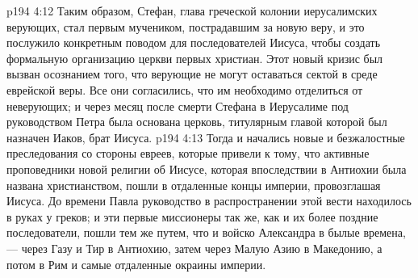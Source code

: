 \vs p194 4:12 Таким образом, Стефан, глава греческой колонии иерусалимских верующих, стал первым мучеником, пострадавшим за новую веру, и это послужило конкретным поводом для последователей Иисуса, чтобы создать формальную организацию церкви первых христиан. Этот новый кризис был вызван осознанием того, что верующие не могут оставаться сектой в среде еврейской веры. Все они согласились, что им необходимо отделиться от неверующих; и через месяц после смерти Стефана в Иерусалиме под руководством Петра была основана церковь, титулярным главой которой был назначен Иаков, брат Иисуса.
\vs p194 4:13 Тогда и начались новые и безжалостные преследования со стороны евреев, которые привели к тому, что активные проповедники новой религии об Иисусе, которая впоследствии в Антиохии была названа христианством, пошли в отдаленные концы империи, провозглашая Иисуса. До времени Павла руководство в распространении этой вести находилось в руках у греков; и эти первые миссионеры так же, как и их более поздние последователи, пошли тем же путем, что и войско Александра в былые времена, --- через Газу и Тир в Антиохию, затем через Малую Азию в Македонию, а потом в Рим и самые отдаленные окраины империи.
